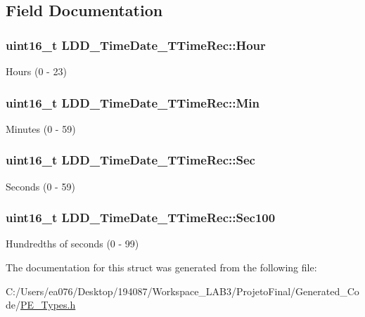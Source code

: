 \subsection{Field Documentation}
\hypertarget{struct_l_d_d___time_date___t_time_rec_ac741c5c14148b2d360bb09fedc6ebabd}{
\subsubsection[{Hour}]{\setlength{\rightskip}{0pt plus 5cm}uint16\-\_\-t L\-D\-D\-\_\-\-Time\-Date\-\_\-\-T\-Time\-Rec\-::\-Hour}}\label{struct_l_d_d___time_date___t_time_rec_ac741c5c14148b2d360bb09fedc6ebabd}
Hours (0 -\/ 23) \hypertarget{struct_l_d_d___time_date___t_time_rec_a7cea2c409e90bccdc33f19b093020373}{
\subsubsection[{Min}]{\setlength{\rightskip}{0pt plus 5cm}uint16\-\_\-t L\-D\-D\-\_\-\-Time\-Date\-\_\-\-T\-Time\-Rec\-::\-Min}}\label{struct_l_d_d___time_date___t_time_rec_a7cea2c409e90bccdc33f19b093020373}
Minutes (0 -\/ 59) \hypertarget{struct_l_d_d___time_date___t_time_rec_a05cccc86e89e5704b0460caaf2429f75}{
\subsubsection[{Sec}]{\setlength{\rightskip}{0pt plus 5cm}uint16\-\_\-t L\-D\-D\-\_\-\-Time\-Date\-\_\-\-T\-Time\-Rec\-::\-Sec}}\label{struct_l_d_d___time_date___t_time_rec_a05cccc86e89e5704b0460caaf2429f75}
Seconds (0 -\/ 59) \hypertarget{struct_l_d_d___time_date___t_time_rec_a2cd2e13e7c478f04ea1c4c460b104491}{
\subsubsection[{Sec100}]{\setlength{\rightskip}{0pt plus 5cm}uint16\-\_\-t L\-D\-D\-\_\-\-Time\-Date\-\_\-\-T\-Time\-Rec\-::\-Sec100}}\label{struct_l_d_d___time_date___t_time_rec_a2cd2e13e7c478f04ea1c4c460b104491}
Hundredths of seconds (0 -\/ 99) 

The documentation for this struct was generated from the following file\-:\begin{DoxyCompactItemize}
\item 
C\-:/\-Users/ea076/\-Desktop/194087/\-Workspace\-\_\-\-L\-A\-B3/\-Projeto\-Final/\-Generated\-\_\-\-Code/\hyperlink{_p_e___types_8h}{P\-E\-\_\-\-Types.\-h}\end{DoxyCompactItemize}
